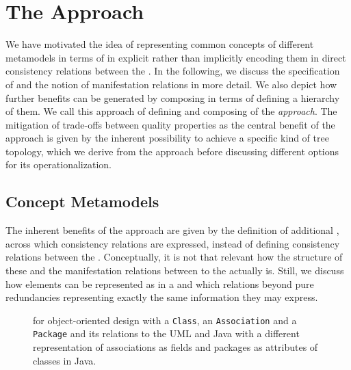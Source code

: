 \section{The \commonalities Approach}
\label{chap:improvement:commonalities}

We have motivated the idea of representing common concepts of different metamodels in terms of \commonalities in explicit \conceptmetamodels rather than implicitly encoding them in direct consistency relations between the \concretemetamodels.
In the following, we discuss the specification of \conceptmetamodels and the notion of manifestation relations in more detail.
We also depict how further benefits can be generated by composing \conceptmetamodels in terms of defining a hierarchy of them.
We call this approach of defining and composing \conceptmetamodels of \commonalities the \emph{\commonalities approach}.
The mitigation of trade-offs between quality properties as the central benefit of the approach is given by the inherent possibility to achieve a specific kind of tree topology, which we derive from the approach before discussing different options for its operationalization.


\subsection{Concept Metamodels}

The inherent benefits of the \commonalities approach are given by the definition of additional \conceptmetamodels, across which consistency relations are expressed, instead of defining consistency relations between the \concretemetamodels.
Conceptually, it is not that relevant how the structure of these \conceptmetamodels and the manifestation relations between to the \concretemetamodels actually is.
Still, we discuss how elements can be represented as \commonalities in a \conceptmetamodel and which relations beyond pure redundancies representing exactly the same information they may express.

\begin{figure}
    \centering
    
    \caption[Multiple \commonality example for object-oriented design]{\Conceptmetamodel for object-oriented design with a \texttt{Class}, an \texttt{Association} and a \texttt{Package} \commonality and its relations to the \concretemetamodels \gls{UML} and Java with a different representation of associations as fields and packages as attributes of classes in Java.}
    \label{fig:improvement:multiple_commonalities_example}
\end{figure}

